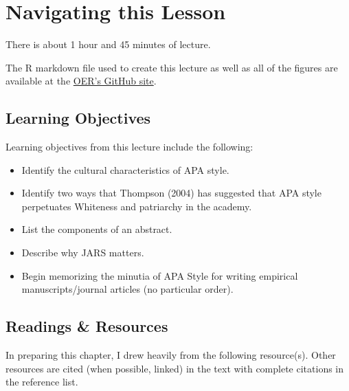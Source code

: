 \documentclass[
  english,
]{book}
\providecommand{\tightlist}{%
  \setlength{\itemsep}{0pt}\setlength{\parskip}{0pt}}
\begin{document}
\hypertarget{navigating-this-lesson-8}{%
\section{Navigating this Lesson}\label{navigating-this-lesson-8}}

There is about 1 hour and 45 minutes of lecture.

The R markdown file used to create this lecture as well as all of the figures are available at the \href{https://github.com/lhbikos/ReC_Topics}{OER's GitHub site}.

\hypertarget{learning-objectives-8}{%
\subsection{Learning Objectives}\label{learning-objectives-8}}

Learning objectives from this lecture include the following:

\begin{itemize}
\tightlist
\item
  Identify the cultural characteristics of APA style.
\item
  Identify two ways that Thompson (2004) has suggested that APA style perpetuates Whiteness and patriarchy in the academy.
\item
  List the components of an abstract.
\item
  Describe why JARS matters.
\item
  Begin memorizing the minutia of APA Style for writing empirical manuscripts/journal articles (no particular order).
\end{itemize}

\hypertarget{readings-resources-8}{%
\subsection{Readings \& Resources}\label{readings-resources-8}}

In preparing this chapter, I drew heavily from the following resource(s). Other resources are cited (when possible, linked) in the text with complete citations in the reference list.
\end{document}
